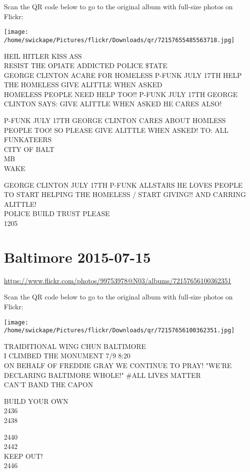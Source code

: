 \documentclass[10pt,letterpaper]{article}
\begin{document}
Scan the QR code below to go to the original album with full-size photos on Flickr:

\texttt{[image: /home/swickape/Pictures/flickr/Downloads/qr/72157655485563718.jpg]}


HEIL HITLER KISS ASS\\
RESIST THE OPIATE ADDICTED POLICE \$TATE\\
GEORGE CLINTON ACARE FOR HOMELESS P{-}FUNK JULY 17TH HELP THE HOMELESS GIVE ALITTLE WHEN ASKED\\
HOMELESS PEOPLE NEED HELP TOO!! P{-}FUNK JULY 17TH GEORGE CLINTON SAYS: GIVE ALITTLE WHEN ASKED HE CARES ALSO!

P{-}FUNK JULY 17TH GEORGE CLINTON CARES ABOUT HOMLESS PEOPLE TOO!  SO PLEASE GIVE ALITTLE WHEN ASKED!  TO: ALL FUNKATEERS\\
CITY OF BALT\\
MB\\
WAKE

GEORGE CLINTON JULY 17TH P{-}FUNK ALLSTARS HE LOVES PEOPLE TO START HELPING THE HOMELESS / START GIVING!! AND CARRING ALITTLE!\\
POLICE BUILD TRUST PLEASE\\
1205


\section*{Baltimore 2015-07-15}

\url{https://www.flickr.com/photos/99753978@N03/albums/72157656100362351}

Scan the QR code below to go to the original album with full-size photos on Flickr:

\texttt{[image: /home/swickape/Pictures/flickr/Downloads/qr/72157656100362351.jpg]}


TRAIDITIONAL WING CHUN BALTIMORE\\
I CLIMBED THE MONUMENT 7/9 8:20\\
ON BEHALF OF FREDDIE GRAY WE CONTINUE TO PRAY!  "WE'RE DECLARING BALTIMORE WHOLE!"  \#ALL LIVES MATTER\\
CAN'T BAND THE CAPON

BUILD YOUR OWN\\
2436\\
2438

2440\\
2442\\
KEEP OUT!\\
2446
\end{document}
